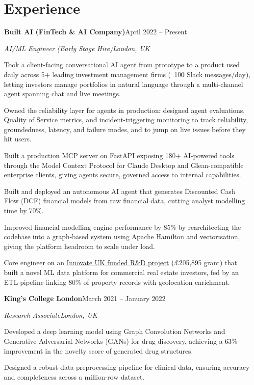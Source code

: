 \documentclass[10pt,a4paper]{article}
\newcommand{\entry}[4]{%
  {\color{company}\bfseries #1}\hfill {\color{muted}#2}\par
  \vspace{1pt}
  {\itshape #3}\hfill {\color{muted}\itshape #4}\par
  \vspace{3pt}%
}
\begin{document}
\section{Experience}
\entry{Built AI (FinTech \& AI Company)}{April 2022 -- Present}{AI/ML Engineer (Early Stage Hire)}{London, UK}
\begin{tight}
  \item Took a client-facing conversational AI agent from prototype to a product used daily across 5+ leading investment management firms (~100 Slack messages/day), letting investors manage portfolios in natural language through a multi-channel agent spanning chat and live meetings.
  \item Owned the reliability layer for agents in production: designed agent evaluations, Quality of Service metrics, and incident-triggering monitoring to track reliability, groundedness, latency, and failure modes, and to jump on live issues before they hit users.
  \item Built a production MCP server on FastAPI exposing 180+ AI-powered tools through the Model Context Protocol for Claude Desktop and Glean-compatible enterprise clients, giving agents secure, governed access to internal capabilities.
  \item Built and deployed an autonomous AI agent that generates Discounted Cash Flow (DCF) financial models from raw financial data, cutting analyst modelling time by 70\%.
  \item Improved financial modelling engine performance by 85\% by rearchitecting the codebase into a graph-based system using Apache Hamilton and vectorisation, giving the platform headroom to scale under load.
  \item Core engineer on an \href{https://gtr.ukri.org/projects?ref=10022996}{Innovate UK funded R\&D project} (\pounds205,895 grant) that built a novel ML data platform for commercial real estate investors, fed by an ETL pipeline linking 80\% of property records with geolocation enrichment.
\end{tight}

\entry{King's College London}{March 2021 -- January 2022}{Research Associate}{London, UK}
\begin{tight}
  \item Developed a deep learning model using Graph Convolution Networks and Generative Adversarial Networks (GANs) for drug discovery, achieving a 63\% improvement in the novelty score of generated drug structures.
  \item Designed a robust data preprocessing pipeline for clinical data, ensuring accuracy and completeness across a million-row dataset.
\end{tight}
\end{document}
